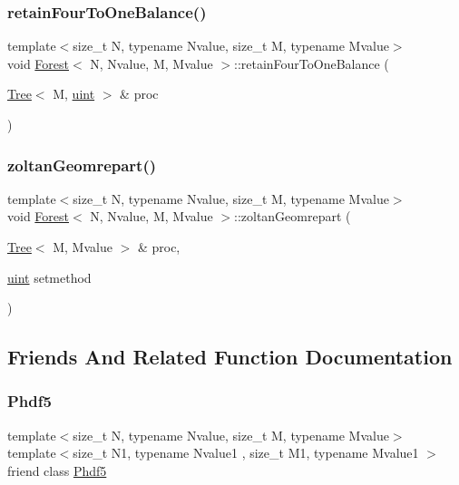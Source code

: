 \subsubsection{\texorpdfstring{retain\+Four\+To\+One\+Balance()}{retainFourToOneBalance()}}
{\footnotesize\ttfamily template$<$size\+\_\+t N, typename Nvalue, size\+\_\+t M, typename Mvalue$>$ \\
void \mbox{\hyperlink{classForest}{Forest}}$<$ N, Nvalue, M, Mvalue $>$\+::retain\+Four\+To\+One\+Balance (\begin{DoxyParamCaption}\item[{\mbox{\hyperlink{classTree}{Tree}}$<$ M, \mbox{\hyperlink{definitions_8h_a69aa29b598b851b0640aa225a9e5d61d}{uint}} $>$ \&}]{proc }\end{DoxyParamCaption})}

\mbox{\label{classForest_ad3d1881090df317c7e9b3afb700b3842}} 
\subsubsection{\texorpdfstring{zoltan\+Geomrepart()}{zoltanGeomrepart()}}
{\footnotesize\ttfamily template$<$size\+\_\+t N, typename Nvalue, size\+\_\+t M, typename Mvalue$>$ \\
void \mbox{\hyperlink{classForest}{Forest}}$<$ N, Nvalue, M, Mvalue $>$\+::zoltan\+Geomrepart (\begin{DoxyParamCaption}\item[{\mbox{\hyperlink{classTree}{Tree}}$<$ M, Mvalue $>$ \&}]{proc,  }\item[{\mbox{\hyperlink{definitions_8h_a69aa29b598b851b0640aa225a9e5d61d}{uint}}}]{setmethod }\end{DoxyParamCaption})}



\subsection{Friends And Related Function Documentation}
\mbox{\label{classForest_a767bab0f40c9f0d8d155b7dc5dda1a8b}} 
\subsubsection{\texorpdfstring{Phdf5}{Phdf5}}
{\footnotesize\ttfamily template$<$size\+\_\+t N, typename Nvalue, size\+\_\+t M, typename Mvalue$>$ \\
template$<$size\+\_\+t N1, typename Nvalue1 , size\+\_\+t M1, typename Mvalue1 $>$ \\
friend class \mbox{\hyperlink{classPhdf5}{Phdf5}}\hspace{0.3cm}{\ttfamily [friend]}}



